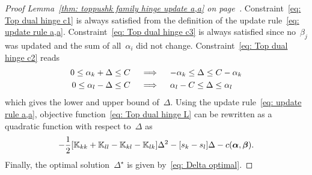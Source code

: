 \topruleaa*
\begin{proof}[Proof Lemma~\ref{thm: toppushk family hinge update a,a} on page~\pageref{thm: toppushk family hinge update a,a}]
  Constraint~\eqref{eq: Top dual hinge c1} is always satisfied from the definition of the update rule~\eqref{eq: update rule a,a}. Constraint~\eqref{eq: Top dual hinge c3} is always satisfied since no~$\beta_j$ was updated and the sum of all~$\alpha_i$ did not change. Constraint~\eqref{eq: Top dual hinge c2} reads
  \begin{align*}
    0 \leq \alpha_k + \Delta \leq C
    & \quad \implies \quad
    - \alpha_k \leq \Delta \leq C - \alpha_k \\
    0 \leq \alpha_l - \Delta \leq C
    & \quad \implies \quad
    \alpha_l - C \leq \Delta \leq \alpha_l
  \end{align*}
  which gives the lower and upper bound of~$\Delta.$ Using the update rule~\eqref{eq: update rule a,a}, objective function~\eqref{eq: Top dual hinge L} can be rewritten as a quadratic function with respect to~$\Delta$ as
  \begin{equation*}
    - \frac{1}{2} \Brac[s]{\K_{kk} + \K_{ll} - \K_{kl} - \K_{lk}} \Delta^2
    - \Brac[s]{s_k - s_l} \Delta
    - c(\bm{\alpha}, \bm{\beta}).
  \end{equation*}
  Finally, the optimal solution~$\Delta^{\star}$ is given by~\eqref{eq: Delta optimal}.
\end{proof}

